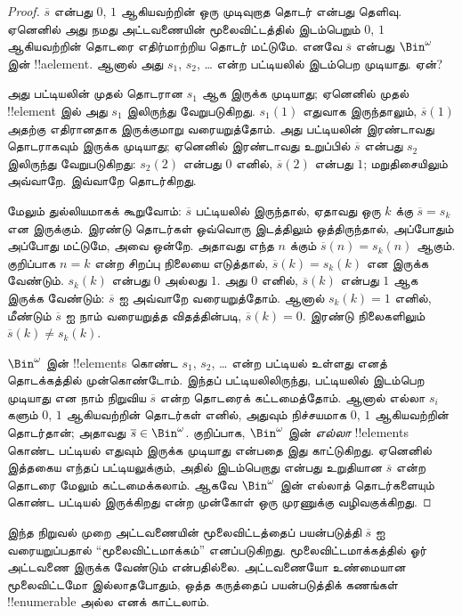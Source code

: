 \documentclass[../../../include/open-logic-section]{subfiles}
\begin{document}
\begin{proof}
$\overline{s}$ என்பது $0$, $1$ ஆகியவற்றின் ஒரு முடிவுறாத தொடர்
என்பது தெளிவு. ஏனெனில் அது நமது அட்டவணையின் மூலைவிட்டத்தில்
இடம்பெறும் $0$, $1$ ஆகியவற்றின் தொடரை எதிர்மாற்றிய தொடர் மட்டுமே.
எனவே $\overline{s}$ என்பது $\Bin^\omega$ இன் !!a{element}.
ஆனால் அது $s_1$, $s_2$, \dots{} என்ற பட்டியலில் இடம்பெற முடியாது.
ஏன்?

அது பட்டியலின் முதல் தொடரான $s_1$ ஆக இருக்க முடியாது;
ஏனெனில் முதல் !!{element} இல் அது $s_1$ இலிருந்து வேறுபடுகிறது.
$s_1(1)$ எதுவாக இருந்தாலும், $\overline{s}(1)$ அதற்கு எதிரானதாக
இருக்குமாறு வரையறுத்தோம்.
அது பட்டியலின் இரண்டாவது தொடராகவும் இருக்க முடியாது;
ஏனெனில் இரண்டாவது உறுப்பில் $\overline{s}$ என்பது $s_2$ இலிருந்து
வேறுபடுகிறது: $s_2(2)$ என்பது $0$ எனில்,
$\overline{s}(2)$ என்பது $1$; மறுதிசையிலும் அவ்வாறே.
இவ்வாறே தொடர்கிறது.

மேலும் துல்லியமாகக் கூறுவோம்:
$\overline{s}$ பட்டியலில் இருந்தால், ஏதாவது ஒரு $k$ க்கு
$\overline{s} = s_{k}$ என இருக்கும்.
இரண்டு தொடர்கள் ஒவ்வொரு இடத்திலும் ஒத்திருந்தால்,
அப்போதும் அப்போது மட்டுமே, அவை ஒன்றே.
அதாவது எந்த $n$ க்கும் $\overline{s}(n) =
s_{k}(n)$ ஆகும்.
குறிப்பாக $n = k$ என்ற சிறப்பு நிலையை எடுத்தால்,
$\overline{s}(k) = s_{k}(k)$ என இருக்க வேண்டும்.
$s_k(k)$ என்பது $0$ அல்லது $1$.
அது $0$ எனில், $\overline{s}(k)$ என்பது $1$ ஆக இருக்க வேண்டும்:
$\overline{s}$ ஐ அவ்வாறே வரையறுத்தோம்.
ஆனால் $s_k(k) = 1$ எனில், மீண்டும் $\overline{s}$ ஐ
நாம் வரையறுத்த விதத்தின்படி,
$\overline{s}(k) = 0$.
இரண்டு நிலைகளிலும் $\overline{s}(k) \neq s_{k}(k)$.

$\Bin^\omega$ இன் !!{element}s கொண்ட
$s_1$, $s_2$, \dots{} என்ற பட்டியல் உள்ளது எனத் தொடக்கத்தில்
முன்கொண்டோம். இந்தப் பட்டியலிலிருந்து, பட்டியலில் இடம்பெற முடியாது
என நாம் நிறுவிய $\overline{s}$ என்ற தொடரைக் கட்டமைத்தோம்.
ஆனால் எல்லா $s_i$ களும் $0$, $1$ ஆகியவற்றின் தொடர்கள் எனில்,
அதுவும் நிச்சயமாக $0$, $1$ ஆகியவற்றின் தொடர்தான்;
அதாவது $\overline{s} \in
\Bin^\omega$.
குறிப்பாக, $\Bin^\omega$ இன் \emph{எல்லா} !!{element}s கொண்ட
பட்டியல் எதுவும் இருக்க முடியாது என்பதை இது காட்டுகிறது.
ஏனெனில் இத்தகைய எந்தப் பட்டியலுக்கும், அதில் இடம்பெறாது என்பது
உறுதியான $\overline{s}$ என்ற தொடரை மேலும் கட்டமைக்கலாம்.
ஆகவே $\Bin^\omega$ இன் எல்லாத் தொடர்களையும் கொண்ட
பட்டியல் இருக்கிறது என்ற முன்கோள் ஒரு முரணுக்கு வழிவகுக்கிறது.
\end{proof}

\begin{explain}
இந்த நிறுவல் முறை அட்டவணையின் மூலைவிட்டத்தைப் பயன்படுத்தி
$\overline{s}$ ஐ வரையறுப்பதால் “மூலைவிட்டமாக்கம்” எனப்படுகிறது.
மூலைவிட்டமாக்கத்தில் ஓர் அட்டவணை இருக்க வேண்டும் என்பதில்லை.
அட்டவணையோ உண்மையான மூலைவிட்டமோ இல்லாதபோதும்,
ஒத்த கருத்தைப் பயன்படுத்திக் கணங்கள் !!{enumerable} அல்ல
எனக் காட்டலாம்.
\end{explain}
\end{document}
